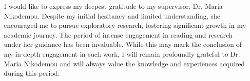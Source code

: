 
\begin{acknowledgements}      


I would like to express my deepest gratitude to my supervisor, Dr. Maria Nikodemou. Despite my initial hesitancy and limited understanding, she encouraged me to pursue exploratory research, fostering significant growth in my academic journey. The period of intense engagement in reading and research under her guidance has been invaluable. While this may mark the conclusion of my in-depth engagement in such work, I will remain profoundly grateful to Dr. Maria Nikodemou and will always value the knowledge and experiences acquired during this period.


\end{acknowledgements}
